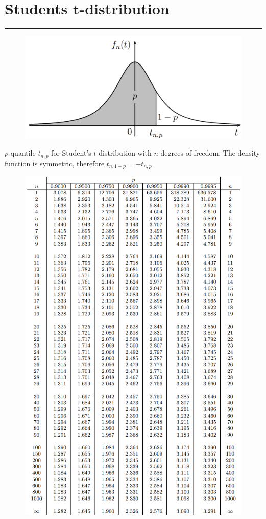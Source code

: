 \section{Students $\mathbf{t}$-distribution}
\noindent\rule[\linienAbstand]{\linewidth}{\linienDickeDick}

\begin{figure}[H]
  \centering
  \includegraphics[width=.7\linewidth]{Pics/T.3.img.png}
\end{figure}
$p$-quantile $t_{n,p}$ for Student’s $t$-distribution with $n$ degrees of freedom. The density function is symmetric, therefore $t_{n,1-p} = -t_{n,p}$.
\begin{figure}[H]
  \centering
  \includegraphics[width=\linewidth]{Pics/T.3.png}
\end{figure}

